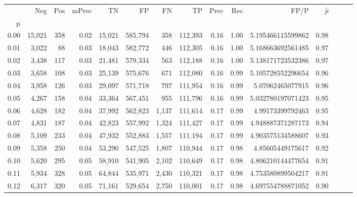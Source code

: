 \begin{tabular}{rrrrrrrrrrrrrrr}
\toprule
{} &     Neg &    Pos & mPrec &       TN &       FP &       FN &       TP &  Prec &   Rec &                  FP/P & $\hat{p}$ \\
p    &         &        &       &          &          &          &          &       &       &                       &           \\
\midrule
0.00 &  15,021 &    358 &  0.02 &   15,021 &  585,794 &      358 &  112,393 &  0.16 &  1.00 &     5.195466115599862 &      0.98 \\
0.01 &   3,022 &     88 &  0.03 &   18,043 &  582,772 &      446 &  112,305 &  0.16 &  1.00 &     5.168663692561485 &      0.97 \\
0.02 &   3,438 &    117 &  0.03 &   21,481 &  579,334 &      563 &  112,188 &  0.16 &  1.00 &     5.138171723532386 &      0.97 \\
0.03 &   3,658 &    108 &  0.03 &   25,139 &  575,676 &      671 &  112,080 &  0.16 &  0.99 &     5.105728552296654 &      0.96 \\
0.04 &   3,958 &    126 &  0.03 &   29,097 &  571,718 &      797 &  111,954 &  0.16 &  0.99 &      5.07062465077915 &      0.96 \\
0.05 &   4,267 &    158 &  0.04 &   33,364 &  567,451 &      955 &  111,796 &  0.16 &  0.99 &     5.032780197071423 &      0.95 \\
0.06 &   4,628 &    182 &  0.04 &   37,992 &  562,823 &    1,137 &  111,614 &  0.17 &  0.99 &      4.99173399792463 &      0.95 \\
0.07 &   4,831 &    187 &  0.04 &   42,823 &  557,992 &    1,324 &  111,427 &  0.17 &  0.99 &     4.948887371287173 &      0.94 \\
0.08 &   5,109 &    233 &  0.04 &   47,932 &  552,883 &    1,557 &  111,194 &  0.17 &  0.99 &     4.903575134588607 &      0.93 \\
0.09 &   5,358 &    250 &  0.04 &   53,290 &  547,525 &    1,807 &  110,944 &  0.17 &  0.98 &      4.85605449175617 &      0.92 \\
0.10 &   5,620 &    295 &  0.05 &   58,910 &  541,905 &    2,102 &  110,649 &  0.17 &  0.98 &     4.806210144477654 &      0.91 \\
0.11 &   5,934 &    328 &  0.05 &   64,844 &  535,971 &    2,430 &  110,321 &  0.17 &  0.98 &     4.753580899504217 &      0.91 \\
0.12 &   6,317 &    320 &  0.05 &   71,161 &  529,654 &    2,750 &  110,001 &  0.17 &  0.98 &     4.697554788871052 &      0.90 \\

\end{tabular}
